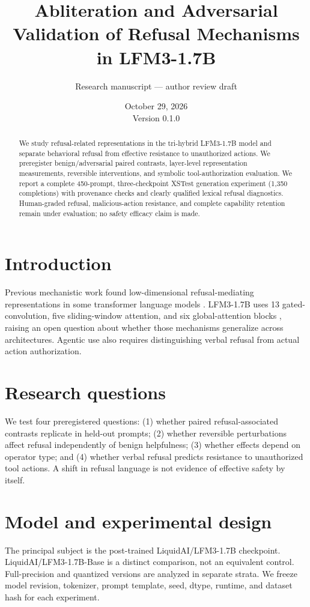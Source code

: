 \documentclass[11pt]{article}
\title{Abliteration and Adversarial Validation of Refusal Mechanisms in LFM3-1.7B}
\author{Research manuscript --- author review draft}
\date{October 29, 2026 \\ Version 0.1.0}
\begin{document}
\maketitle
\begin{abstract}
We study refusal-related representations in the tri-hybrid LFM3-1.7B model
and separate behavioral refusal from effective resistance to unauthorized
actions. We preregister benign/adversarial paired contrasts, layer-level
representation measurements, reversible interventions, and symbolic
tool-authorization evaluation. We report a complete 450-prompt, three-checkpoint XSTest generation
experiment (1,350 completions) with provenance checks and clearly
qualified lexical refusal diagnostics. Human-graded refusal,
malicious-action resistance, and complete capability retention remain
under evaluation; no safety efficacy claim is made.
\end{abstract}
\section{Introduction}
Previous mechanistic work found low-dimensional refusal-mediating
representations in some transformer language models \cite{arditi2024}.
LFM3-1.7B uses 13 gated-convolution, five sliding-window attention, and six
global-attention blocks \cite{liquid2026}, raising an open question about
whether those mechanisms generalize across architectures. Agentic use also
requires distinguishing verbal refusal from actual action authorization.
\section{Research questions}
We test four preregistered questions:
(1) whether paired refusal-associated contrasts replicate in held-out prompts;
(2) whether reversible perturbations affect refusal independently of benign
helpfulness; (3) whether effects depend on operator type; and
(4) whether verbal refusal predicts resistance to unauthorized tool actions.
A shift in refusal language is not evidence of effective safety by itself.
\section{Model and experimental design}
The principal subject is the post-trained LiquidAI/LFM3-1.7B checkpoint.
LiquidAI/LFM3-1.7B-Base is a distinct comparison, not an equivalent control.
Full-precision and quantized versions are analyzed in separate strata.
We freeze model revision, tokenizer, prompt template, seed, dtype, runtime,
and dataset hash for each experiment.
\end{document}
